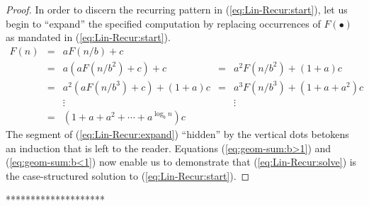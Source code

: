 {\begin{proof}
In order to discern the recurring pattern in
(\ref{eq:Lin-Recur:start}), let us begin to ``expand'' the specified
computation by replacing occurrences of $F(\bullet)$ as mandated in
(\ref{eq:Lin-Recur:start}).
\begin{equation}
\label{eq:Lin-Recur:expand}
\begin{array}{lcccc}
F(n) & = & a F(n/b) + c & & \\
     & = & a \left( a F(n/b^2) + c \right) + c
             & = & a^2 F(n/b^2) + (1 + a)c \\
     & = & a^2 \left( a F(n/b^3) + c \right) + (1+a)c
             & = & a^3 F(n/b^3) + (1 + a + a^2)c \\
     &   & \vdots & & \vdots \\
     & = & 
{\displaystyle
\left( 1 + a + a^2 + \cdots + a^{\log_b n} \right) c
} & &
\end{array}
\end{equation}
The segment of (\ref{eq:Lin-Recur:expand}) ``hidden'' by the vertical
dots betokens an induction that is left to the reader.  Equations
(\ref{eq:geom-sum:b>1}) and (\ref{eq:geom-sum:b<1}) now enable us to
demonstrate that (\ref{eq:Lin-Recur:solve}) is the case-structured
solution to (\ref{eq:Lin-Recur:start}).
\end{proof}
********************}

